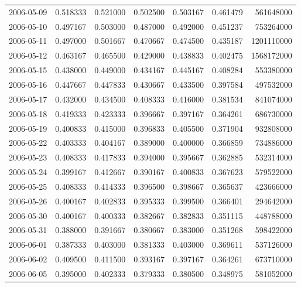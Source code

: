 \begin{tabular}{lrrrrrr}
2006-05-09 &    0.518333 &    0.521000 &    0.502500 &    0.503167 &    0.461479 &   561648000 \\
2006-05-10 &    0.497167 &    0.503000 &    0.487000 &    0.492000 &    0.451237 &   753264000 \\
2006-05-11 &    0.497000 &    0.501667 &    0.470667 &    0.474500 &    0.435187 &  1201110000 \\
2006-05-12 &    0.463167 &    0.465500 &    0.429000 &    0.438833 &    0.402475 &  1568172000 \\
2006-05-15 &    0.438000 &    0.449000 &    0.434167 &    0.445167 &    0.408284 &   553380000 \\
2006-05-16 &    0.447667 &    0.447833 &    0.430667 &    0.433500 &    0.397584 &   497532000 \\
2006-05-17 &    0.432000 &    0.434500 &    0.408333 &    0.416000 &    0.381534 &   841074000 \\
2006-05-18 &    0.419333 &    0.423333 &    0.396667 &    0.397167 &    0.364261 &   686730000 \\
2006-05-19 &    0.400833 &    0.415000 &    0.396833 &    0.405500 &    0.371904 &   932808000 \\
2006-05-22 &    0.403333 &    0.404167 &    0.389000 &    0.400000 &    0.366859 &   734886000 \\
2006-05-23 &    0.408333 &    0.417833 &    0.394000 &    0.395667 &    0.362885 &   532314000 \\
2006-05-24 &    0.399167 &    0.412667 &    0.390167 &    0.400833 &    0.367623 &   579522000 \\
2006-05-25 &    0.408333 &    0.414333 &    0.396500 &    0.398667 &    0.365637 &   423666000 \\
2006-05-26 &    0.400167 &    0.402833 &    0.395333 &    0.399500 &    0.366401 &   294642000 \\
2006-05-30 &    0.400167 &    0.400333 &    0.382667 &    0.382833 &    0.351115 &   448788000 \\
2006-05-31 &    0.388000 &    0.391667 &    0.380667 &    0.383000 &    0.351268 &   598422000 \\
2006-06-01 &    0.387333 &    0.403000 &    0.381333 &    0.403000 &    0.369611 &   537126000 \\
2006-06-02 &    0.409500 &    0.411500 &    0.393167 &    0.397167 &    0.364261 &   673710000 \\
2006-06-05 &    0.395000 &    0.402333 &    0.379333 &    0.380500 &    0.348975 &   581052000 \\

\end{tabular}
